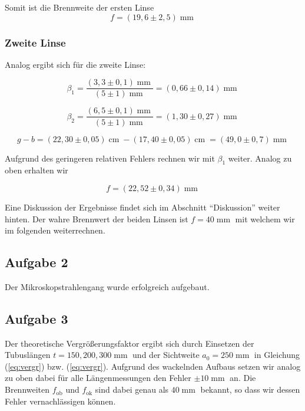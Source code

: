 \documentclass[a4paper,german,12pt,smallheadings]{scrartcl}
\begin{document}
Somit ist die Brennweite der ersten Linse
\begin{equation}
  f = (19{,}6\pm2{,}5) \operatorname{mm}
\end{equation}

\subsubsection{Zweite Linse}

Analog ergibt sich für die zweite Linse:

\begin{equation}
  \beta_1 = \frac{(3{,}3 \pm 0{,}1) \operatorname{mm}}{(5\pm1) \operatorname{mm}} = (0{,}66\pm0{,}14) \operatorname{mm}
\end{equation}

\begin{equation}
  \beta_2 = \frac{(6{,}5 \pm 0{,}1) \operatorname{mm}}{(5\pm1) \operatorname{mm}} = (1{,}30\pm0{,}27) \operatorname{mm}
\end{equation}

\begin{equation}
  g -b = (22{,}30\pm0{,}05) \operatorname{cm} -
         (17{,}40 \pm 0{,}05) \operatorname{cm}
         = (49{,}0\pm0{,}7) \operatorname{mm}
\end{equation}

Aufgrund des geringeren relativen Fehlers rechnen wir mit $\beta_1$ weiter.
Analog zu oben erhalten wir

\begin{equation}
  f = (22{,}52 \pm 0{,}34) \operatorname{mm}
\end{equation}

Eine Diskussion der Ergebnisse findet sich im Abschnitt ``Diskussion'' weiter
hinten. Der wahre Brennwert der beiden Linsen ist $f = 40 \operatorname{mm}$
mit welchem wir im folgenden weiterrechnen.

\subsection{Aufgabe 2}

Der Mikroskopstrahlengang wurde erfolgreich aufgebaut.

\subsection{Aufgabe 3}
Der theoretische Vergrößerungsfaktor ergibt sich durch Einsetzen der
Tubuslängen $t = {150, 200, 300} \operatorname{mm}$ und der Sichtweite $a_0 =
250 \operatorname{mm}$ in Gleichung (\ref{eq:vergr}) bzw. (\ref{eq:vergr}).
Aufgrund des wackelnden Aufbaus setzen wir analog zu oben dabei für alle
Längenmessungen den Fehler $\pm 10 \operatorname{mm}$ an. Die Brennweiten
$f_\text{ob}$ und $f_\text{ok}$ sind dabei genau als $40 \operatorname{mm}$
bekannt, so dass wir dessen Fehler vernachlässigen können.
\end{document}
